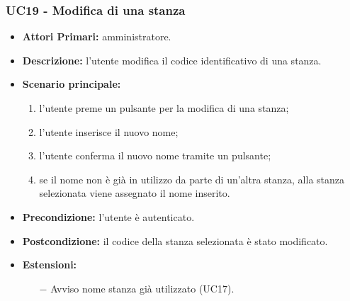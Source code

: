 \subsubsection{UC19 - Modifica di una stanza}
\begin{itemize}
	\item\textbf{Attori Primari:}
	amministratore.
	\item\textbf{Descrizione:}
	l'utente modifica il codice identificativo di una stanza.
	\item\textbf{Scenario principale:} 
	\begin{enumerate}
		\item l'utente preme un pulsante per la modifica di una stanza;
		\item l'utente inserisce il nuovo nome;
		\item l'utente conferma il nuovo nome tramite un pulsante;
		\item se il nome non è già in utilizzo da parte di un'altra stanza, alla stanza selezionata viene assegnato il nome inserito.
	\end{enumerate}
	\item\textbf{Precondizione:} 
	l'utente è autenticato.
	\item\textbf{Postcondizione:}
	il codice della stanza selezionata è stato modificato.
	\item\textbf{Estensioni:}
	\begin{itemize}
		\item[$-$] Avviso nome stanza già utilizzato (UC17).
	\end{itemize}
\end{itemize}


